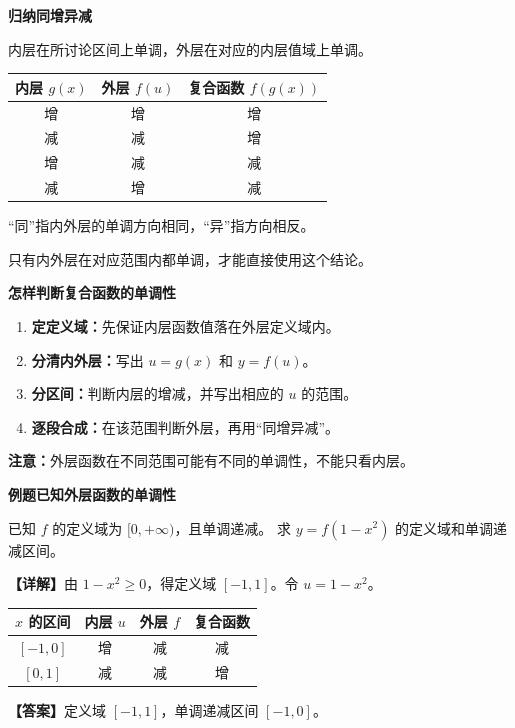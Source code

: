 \documentclass[UTF8,10pt,aspectratio=169]{ctexbeamer}
\newcommand{\PageHeading}[1]{\begin{center}{\Large\bfseries #1}\end{center}\vspace{0.2cm}}
\newcommand{\Answer}[1]{\par\vspace{0.2cm}\textbf{【答案】}#1}
\newcommand{\Analysis}[1]{\par\vspace{0.2cm}\textbf{【详解】}#1}
\begin{document}
\begin{frame}[t,label=F09]
  \PageHeading{归纳\quad 同增异减}
  内层在所讨论区间上单调，外层在对应的内层值域上单调。
  \begin{center}
  \renewcommand{\arraystretch}{1.6}
  \begin{tabular}{c|c|c}
    内层 $g(x)$ & 外层 $f(u)$ & 复合函数 $f(g(x))$\\\hline
    增 & 增 & 增\\
    减 & 减 & 增\\
    增 & 减 & 减\\
    减 & 增 & 减
  \end{tabular}
  \end{center}
  \pause
  “同”指内外层的单调方向相同，“异”指方向相反。
  \par 只有内外层在对应范围内都单调，才能直接使用这个结论。
\end{frame}

\begin{frame}[t,label=F10]
  \PageHeading{怎样判断复合函数的单调性}
  \begin{enumerate}
    \item \textbf{定定义域：}先保证内层函数值落在外层定义域内。
    \item \textbf{分清内外层：}写出 $u=g(x)$ 和 $y=f(u)$。
    \item \textbf{分区间：}判断内层的增减，并写出相应的 $u$ 的范围。
    \item \textbf{逐段合成：}在该范围判断外层，再用“同增异减”。
  \end{enumerate}
  \pause
  \par\vspace{0.3cm}
  \textbf{注意：}外层函数在不同范围可能有不同的单调性，不能只看内层。
\end{frame}

\begin{frame}[t,label=F11]
  \PageHeading{例题\quad 已知外层函数的单调性}
  已知 $f$ 的定义域为 $[0,+\infty)$，且单调递减。
  求 $y=f(1-x^2)$ 的定义域和单调递减区间。
  \pause
  \Analysis{由 $1-x^2\ge0$，得定义域 $[-1,1]$。令 $u=1-x^2$。
  \begin{center}
  \renewcommand{\arraystretch}{1.4}
  \begin{tabular}{c|c|c|c}
    $x$ 的区间 & 内层 $u$ & 外层 $f$ & 复合函数\\\hline
    $[-1,0]$ & 增 & 减 & 减\\
    $[0,1]$ & 减 & 减 & 增
  \end{tabular}
  \end{center}}
  \Answer{定义域 $[-1,1]$，单调递减区间 $[-1,0]$。}
\end{frame}
\end{document}
